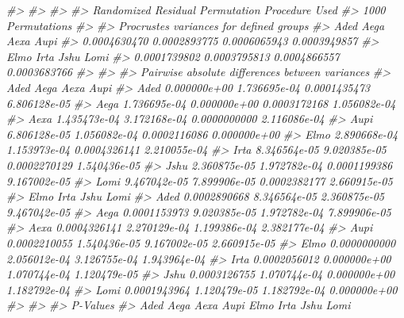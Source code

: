 \documentclass[
]{book}
\newenvironment{Shaded}{\begin{snugshade}}{\end{snugshade}}
\newcommand{\CommentTok}[1]{\textcolor[rgb]{0.56,0.35,0.01}{\textit{#1}}}
\begin{document}
\begin{Shaded}
\begin{Highlighting}[]
\CommentTok{\#\textgreater{} }
\CommentTok{\#\textgreater{} }
\CommentTok{\#\textgreater{} }
\CommentTok{\#\textgreater{} Randomized Residual Permutation Procedure Used}
\CommentTok{\#\textgreater{} 1000 Permutations}
\CommentTok{\#\textgreater{} }
\CommentTok{\#\textgreater{} Procrustes variances for defined groups}
\CommentTok{\#\textgreater{}         Aded         Aega         Aexa         Aupi }
\CommentTok{\#\textgreater{} 0.0004630470 0.0002893775 0.0006065943 0.0003949857 }
\CommentTok{\#\textgreater{}         Elmo         Irta         Jshu         Lomi }
\CommentTok{\#\textgreater{} 0.0001739802 0.0003795813 0.0004866557 0.0003683766 }
\CommentTok{\#\textgreater{} }
\CommentTok{\#\textgreater{} }
\CommentTok{\#\textgreater{} Pairwise absolute differences between variances}
\CommentTok{\#\textgreater{}              Aded         Aega         Aexa         Aupi}
\CommentTok{\#\textgreater{} Aded 0.000000e+00 1.736695e{-}04 0.0001435473 6.806128e{-}05}
\CommentTok{\#\textgreater{} Aega 1.736695e{-}04 0.000000e+00 0.0003172168 1.056082e{-}04}
\CommentTok{\#\textgreater{} Aexa 1.435473e{-}04 3.172168e{-}04 0.0000000000 2.116086e{-}04}
\CommentTok{\#\textgreater{} Aupi 6.806128e{-}05 1.056082e{-}04 0.0002116086 0.000000e+00}
\CommentTok{\#\textgreater{} Elmo 2.890668e{-}04 1.153973e{-}04 0.0004326141 2.210055e{-}04}
\CommentTok{\#\textgreater{} Irta 8.346564e{-}05 9.020385e{-}05 0.0002270129 1.540436e{-}05}
\CommentTok{\#\textgreater{} Jshu 2.360875e{-}05 1.972782e{-}04 0.0001199386 9.167002e{-}05}
\CommentTok{\#\textgreater{} Lomi 9.467042e{-}05 7.899906e{-}05 0.0002382177 2.660915e{-}05}
\CommentTok{\#\textgreater{}              Elmo         Irta         Jshu         Lomi}
\CommentTok{\#\textgreater{} Aded 0.0002890668 8.346564e{-}05 2.360875e{-}05 9.467042e{-}05}
\CommentTok{\#\textgreater{} Aega 0.0001153973 9.020385e{-}05 1.972782e{-}04 7.899906e{-}05}
\CommentTok{\#\textgreater{} Aexa 0.0004326141 2.270129e{-}04 1.199386e{-}04 2.382177e{-}04}
\CommentTok{\#\textgreater{} Aupi 0.0002210055 1.540436e{-}05 9.167002e{-}05 2.660915e{-}05}
\CommentTok{\#\textgreater{} Elmo 0.0000000000 2.056012e{-}04 3.126755e{-}04 1.943964e{-}04}
\CommentTok{\#\textgreater{} Irta 0.0002056012 0.000000e+00 1.070744e{-}04 1.120479e{-}05}
\CommentTok{\#\textgreater{} Jshu 0.0003126755 1.070744e{-}04 0.000000e+00 1.182792e{-}04}
\CommentTok{\#\textgreater{} Lomi 0.0001943964 1.120479e{-}05 1.182792e{-}04 0.000000e+00}
\CommentTok{\#\textgreater{} }
\CommentTok{\#\textgreater{} }
\CommentTok{\#\textgreater{} P{-}Values}
\CommentTok{\#\textgreater{}       Aded  Aega  Aexa  Aupi  Elmo  Irta  Jshu  Lomi}

\end{Highlighting}
\end{Shaded}
\end{document}
